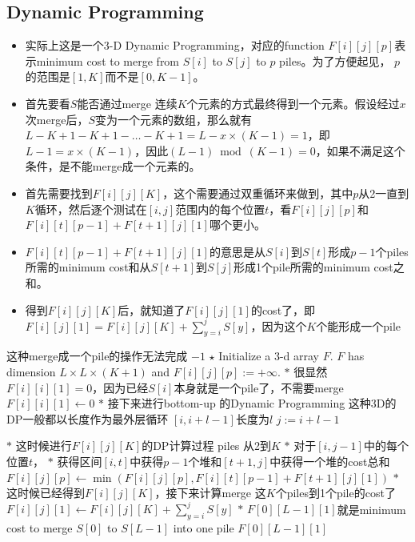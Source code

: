 \subsection{Dynamic Programming}
\begin{itemize}
\item 实际上这是一个3-D Dynamic Programming，对应的function $F[i][j][p]$表示minimum cost to merge from $S[i]$ to $S[j]$ to $p$ piles。为了方便起见， $p$的范围是$[1,K]$而不是$[0,K-1]$。
\item 首先要看$S$能否通过merge 连续$K$个元素的方式最终得到一个元素。假设经过$x$次merge后，$S$变为一个元素的数组，那么就有$L-K+1-K+1-\ldots-K+1=L-x\times(K-1)=1$，即$L-1=x\times(K-1)$，因此$(L-1)\bmod(K-1)=0$，如果不满足这个条件，是不能merge成一个元素的。
\item 首先需要找到$F[i][j][K]$，这个需要通过双重循环来做到，其中$p$从2一直到$K$循环，然后逐个测试在$[i,j]$范围内的每个位置$t$，看$F[i][j][p]$和$F[i][t][p-1]+F[t+1][j][1]$哪个更小。
\item $F[i][t][p-1]+F[t+1][j][1]$的意思是从$S[i]$到$S[t]$形成$p-1$个piles所需的minimum cost和从$S[t+1]$到$S[j]$形成1个pile所需的minimum cost之和。
\item 得到$F[i][j][K]$后，就知道了$F[i][j][1]$的cost了，即$F[i][j][1] = F[i][j][K] + \sum\limits_{y=i}^{j}S[y]$，因为这个$K$个能形成一个pile
\end{itemize}
\setcounter{algorithm}{0}
\begin{algorithm}[H]
\caption{}
\begin{algorithmic}[1]
 \Comment 这种merge成一个pile的操作无法完成
\State \Return $-1$
\EndIf
\State $\star$ Initialize a 3-d array $F$. $F$ has dimension $L\times L \times (K+1)$ and $F[i][j][p]:=+\infty$.
\State $\ast$ 很显然$F[i][i][1]=0$，因为已经$S[i]$本身就是一个pile了，不需要merge
\State $F[i][i][1]\gets 0$
\EndFor 
\State $\ast$ 接下来进行bottom-up 的Dynamic Programming
 \Comment 这种3D的DP一般都以长度作为最外层循环
 \Comment $[i, i+l-1]$长度为$l$
\State $j:=i+l-1$
\end{algorithmic}
\end{algorithm}
\begin{algorithm}[H]
\begin{algorithmic}[1]
\State $\ast$ 这时候进行$F[i][j][K]$的DP计算过程
 \Comment piles 从2到$K$
\State $\ast$ 对于$[i,j-1]$中的每个位置$t$，
\State $\ast$ 获得区间$[i,t]$中获得$p-1$个堆和$[t+1,j]$中获得一个堆的cost总和
\State $F[i][j][p]\gets \min(F[i][j][p], F[i][t][p-1] + F[t+1][j][1])$
\EndFor
\EndFor
\State $\ast$ 这时候已经得到$F[i][j][K]$，接下来计算merge 这$K$个piles到1个pile的cost了
\State $F[i][j][1]\gets F[i][j][K] + \sum\limits_{y=i}^{j}S[y]$
\EndFor
\EndFor
\State $\ast$ $F[0][L-1][1]$就是minimum cost to merge $S[0]$ to $S[L-1]$ into one pile
\State \Return $F[0][L-1][1]$
\EndProcedure
\end{algorithmic}
\end{algorithm}
